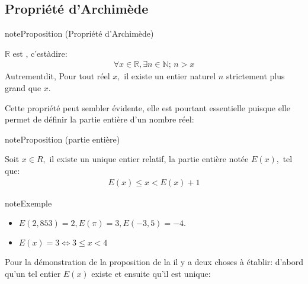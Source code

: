 \documentclass[letterpaper,10pt,french]{jupyterBook}
\begin{document}
\subsection{Propriété d’Archimède}
\label{\detokenize{proprties:propriete-d-archimede}}
\begin{sphinxadmonition}{note}{Proposition (Propriété d’Archimède)}

\sphinxAtStartPar
\(\mathbb{R}\) est , c’est\sphinxhyphen{}à\sphinxhyphen{}dire:
\begin{equation*}
\begin{split}
\forall x\in \mathbb{R},\exists n\in \mathbb{N};\,n> x
\end{split}
\end{equation*}
\sphinxAtStartPar
Autrementdit, Pour tout réel \(x,\) il existe un entier naturel \(n\) strictement plus grand que \(x.\)
\end{sphinxadmonition}

\sphinxAtStartPar
Cette propriété peut sembler évidente, elle est pourtant essentielle puisque elle permet de définir la partie entière
d’un nombre réel:

\begin{sphinxadmonition}{note}{Proposition (partie entière)}

\sphinxAtStartPar
Soit \(x\in R,\) il existe un unique entier relatif, la partie entière notée \(E(x),\) tel que:
\begin{equation*}
\begin{split}
E(x)\leq x< E(x)+1
\end{split}
\end{equation*}\end{sphinxadmonition}

\begin{sphinxadmonition}{note}{Exemple}
\begin{itemize}
\item {} 
\sphinxAtStartPar
\(E(2, 853) = 2, E(\pi) = 3, E(-3,5) =-4.\)

\item {} 
\sphinxAtStartPar
\(E(x)=3\Leftrightarrow 3\leq x <4\)

\end{itemize}
\end{sphinxadmonition}

\sphinxAtStartPar
Pour la démonstration de la proposition de la  il y a deux choses à établir: d’abord qu’un tel entier \(E(x)\) existe et ensuite
qu’il est unique:
\end{document}
